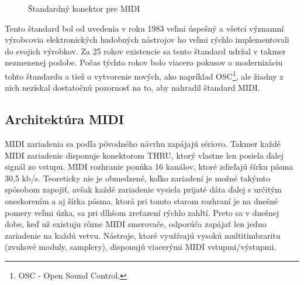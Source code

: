 \begin{figure}[ht]
\centering
{}
\caption{\label{obr02} Štandardný konektor pre MIDI}
\end{figure}

Tento štandard bol od uvedenia v roku 1983 veľmi úspešný a všetci významní výrobcovia elektronických hudobných nástrojov ho veľmi rýchlo implementovali do svojich výrobkov. Za 25 rokov existencie sa tento štandard udržal v takmer nezmenenej podobe. Počas týchto rokov bolo viacero pokusov o modernizáciu tohto štandardu a tiež o vytvorenie nových, ako napríklad OSC\footnote{OSC - Open Sound Control.}, ale žiadny z nich nezískal dostatočnú pozornosť na to, aby nahradil štandard MIDI.

\subsection{Architektúra MIDI}
MIDI zariadenia sa podľa pôvodného návrhu zapájajú sériovo. Takmer každé MIDI zariadenie disponuje konektorom THRU, ktorý vlastne len posiela ďalej signál zo vstupu. MIDI rozhranie ponúka 16 kanálov, ktoré zdieľajú šírku pásma 30,5 kb/s.  Teoreticky nie je obmedzené, koľko zariadení je možné takýmto spôsobom zapojiť, avšak každé zariadenie vysiela prijaté dáta ďalej s určitým oneskorením a aj šírka pásma, ktorá pri tomto starom rozhraní je na dnešné pomery veľmi úzka, sa pri dlhšom zreťazení rýchlo zahltí. Preto sa v dnešnej dobe, keď už existuju rôzne MIDI smerovače, odporúča zapájať len jedno zariadenie na každú vetvu. Nástroje, ktoré využívajú vysokú multitimbraritu (zvukové moduly, samplery), disponujú viacerými MIDI vstupmi/výstupmi.


